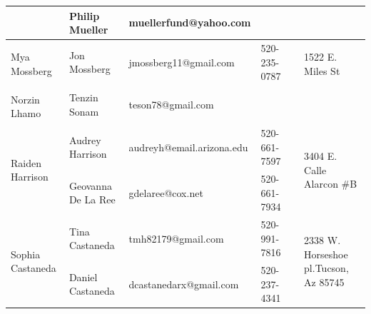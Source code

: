 \documentclass[landscape]{article}\usepackage[]{graphicx}\usepackage[]{color}
\begin{document}
\begin{longtable}{|p{100pt}|p{100pt}|p{140pt}|p{60pt}|p{64pt}|p{120pt}|}
 & Philip Mueller & muellerfund@yahoo.com &  &  & \\
\hline
\multirow{2}{100pt}{Mya Mossberg} & Jon Mossberg & jmossberg11@gmail.com & 520-235-0787 &  & \multirow{2}{120pt}{1522 E. Miles St} \\
 &  &  &  &  & \\
\hline
\multirow{2}{100pt}{Norzin Lhamo} & Tenzin Sonam & teson78@gmail.com &  &  & \multirow{2}{120pt}{} \\
 &  &  &  &  & \\
\hline
\multirow{2}{100pt}{Raiden Harrison} & Audrey Harrison & audreyh@email.arizona.edu & 520-661-7597 &  & \multirow{2}{120pt}{3404 E. Calle Alarcon \#B} \\
 & Geovanna De La Ree & gdelaree@cox.net & 520-661-7934 &  & \\
\hline
\multirow{2}{100pt}{Sophia Castaneda} & Tina Castaneda & tmh82179@gmail.com & 520-991-7816 &  & \multirow{2}{120pt}{2338 W. Horseshoe pl.Tucson, Az 85745} \\
 & Daniel Castaneda & dcastanedarx@gmail.com & 520-237-4341 &  & \\
\hline
\end{longtable}
\newpage
\end{document}
